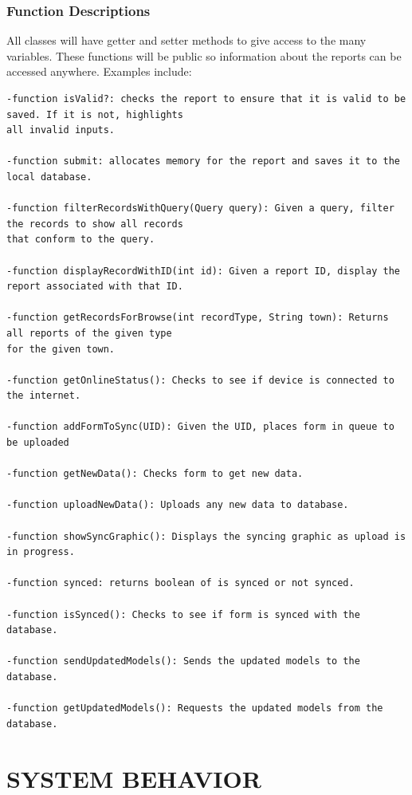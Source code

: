 \documentclass[twoside,letterpaper]{article}
\begin{document}
{\subsubsection{Function Descriptions}
All classes will have getter and setter methods to give access to the many variables. These functions will be public so information about the reports can be accessed anywhere. Examples include:
\begin{center}
\begin{verbatim}
-function isValid?: checks the report to ensure that it is valid to be saved. If it is not, highlights
all invalid inputs.

-function submit: allocates memory for the report and saves it to the local database.

-function filterRecordsWithQuery(Query query): Given a query, filter the records to show all records
that conform to the query.

-function displayRecordWithID(int id): Given a report ID, display the report associated with that ID.

-function getRecordsForBrowse(int recordType, String town): Returns all reports of the given type
for the given town.

-function getOnlineStatus(): Checks to see if device is connected to the internet.

-function addFormToSync(UID): Given the UID, places form in queue to be uploaded

-function getNewData(): Checks form to get new data.

-function uploadNewData(): Uploads any new data to database.

-function showSyncGraphic(): Displays the syncing graphic as upload is in progress.

-function synced: returns boolean of is synced or not synced.

-function isSynced(): Checks to see if form is synced with the database.

-function sendUpdatedModels(): Sends the updated models to the database.

-function getUpdatedModels(): Requests the updated models from the database.
\end{verbatim}
\end{center}

\clearpage\section[SYSTEM BEHAVIOR]{\rmfamily\bfseries\color{black}
SYSTEM BEHAVIOR}

}
\end{document}
